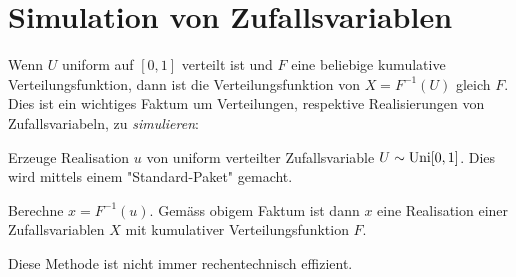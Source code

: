 \section{Simulation von Zufallsvariablen}
Wenn $U$ uniform auf $[0,1]$ verteilt ist und $F$ eine beliebige kumulative Verteilungsfunktion, dann ist die Verteilungsfunktion von $X=F^{-1}(U)$ gleich $F$. Dies ist ein wichtiges Faktum um Verteilungen, respektive Realisierungen von Zufallsvariabeln, zu \emph{simulieren}:
\begin{compactenum}[1.]
	\item Erzeuge Realisation $u$ von uniform verteilter Zufallsvariable $U\sim\operatorname{Uni}[0,1]$. Dies wird mittels einem "Standard-Paket" gemacht.
	\item Berechne $x=F^{-1}(u)$. Gemäss obigem Faktum ist dann $x$ eine Realisation einer Zufallsvariablen $X$ mit kumulativer Verteilungsfunktion $F$.
\end{compactenum}
Diese Methode ist nicht immer rechentechnisch effizient.
